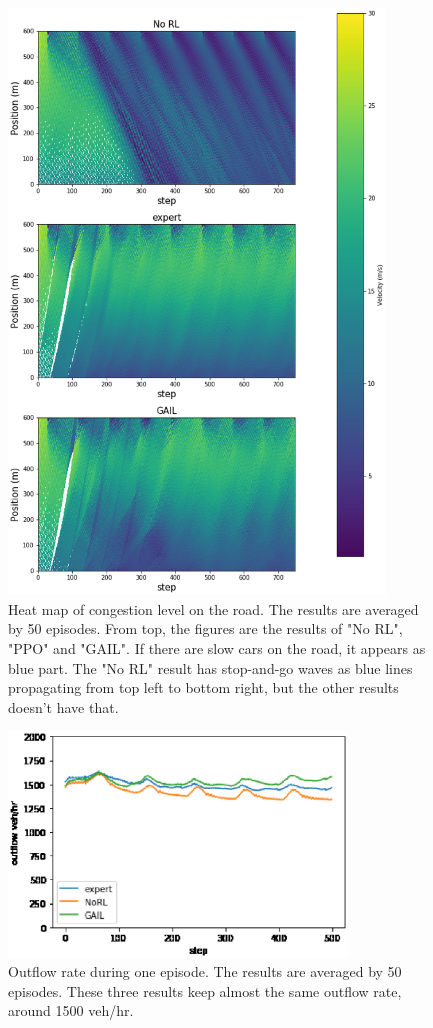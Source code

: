 \begin{figure}[]
    \begin{center}
    \includegraphics[width=10cm]{img/congestion.eps}
    \caption{Heat map of congestion level on the road. The results are averaged by 50 episodes. From top, the figures are the results of "No RL", "PPO" and "GAIL". If there are slow cars on the road, it appears as blue part. The "No RL" result has stop-and-go waves as blue lines propagating from top left to bottom right, but the other results doesn't have that.}
    \label{fig:congestion}
    \end{center}
\end{figure}

\begin{figure}[]
    \begin{center}
    \includegraphics[width=9cm]{img/outflow.eps}
    \caption{Outflow rate during one episode. The results are averaged by 50 episodes. These three results keep almost the same outflow rate, around 1500 veh/hr.}
    \label{fig:outflow}
    \end{center}
\end{figure}

